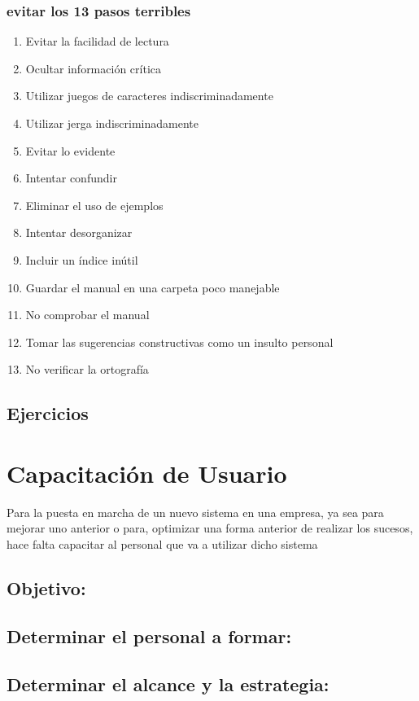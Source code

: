 \documentclass[12pt]{book}
\begin{document}
\subsection{evitar los 13 pasos terribles}
\begin{enumerate}

	\item Evitar la facilidad de lectura
	\item Ocultar información crítica
	\item Utilizar juegos de caracteres indiscriminadamente
	\item Utilizar jerga indiscriminadamente
	\item Evitar lo evidente
	\item Intentar confundir
	\item Eliminar el uso de ejemplos
	\item Intentar desorganizar
	\item Incluir un índice inútil
	\item Guardar el manual en una carpeta poco manejable
	\item No comprobar el manual
	\item Tomar las sugerencias constructivas como un insulto personal 	
	\item No verificar la ortografía

\end{enumerate}


\section{Ejercicios}


\chapter{Capacitación de Usuario}
\parindent=8mm
Para la puesta en marcha de un nuevo sistema en una empresa, ya sea para mejorar uno anterior o para, optimizar una forma anterior de realizar los sucesos, hace falta capacitar al personal que va a utilizar dicho sistema

\section{Objetivo:}
\section{Determinar el personal a formar:}
\section{Determinar el alcance y la estrategia:}
\end{document}
